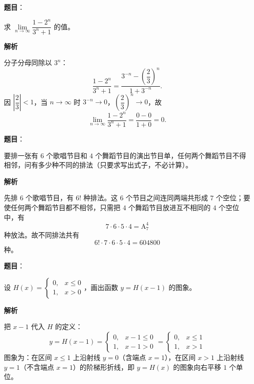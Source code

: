 \begin{answer}

\textbf{题目}：

求 $\lim\limits_{n\to\infty}\dfrac{1-2^n}{3^n+1}$ 的值。

\textbf{解析}

分子分母同除以 $3^n$：
\nopagebreak[4]
\[
\frac{1-2^n}{3^n+1}=\frac{3^{-n}-\left(\dfrac23\right)^n}{1+3^{-n}}.
\]
因 $\left|\dfrac23\right|<1$，当 $n\to\infty$ 时 $3^{-n}\to0$，$\left(\dfrac23\right)^n\to0$，故
\nopagebreak[4]
\[
\lim_{n\to\infty}\frac{1-2^n}{3^n+1}=\frac{0-0}{1+0}=0.
\]


\end{answer}
\begin{answer}

\textbf{题目}：

要排一张有 $6$ 个歌唱节目和 $4$ 个舞蹈节目的演出节目单，任何两个舞蹈节目不得相邻，问有多少种不同的排法（只要求写出式子，不必计算）。

\textbf{解析}

先排 $6$ 个歌唱节目，有 $6!$ 种排法。这 $6$ 个节目之间连同两端共形成 $7$ 个空位；要使任何两个舞蹈节目都不相邻，只需把 $4$ 个舞蹈节目放进互不相同的 $4$ 个空位中，有
\nopagebreak[4]
\[
7\cdot6\cdot5\cdot4=\mathrm{A}_7^4
\]
种放法。故不同排法共有
\nopagebreak[4]
\[
6!\cdot7\cdot6\cdot5\cdot4=604800
\]
种。


\end{answer}
\begin{answer}

\textbf{题目}：

设 $H(x)=\begin{cases}0,&x\leqslant0\\1,&x>0\end{cases}$，画出函数 $y=H(x-1)$ 的图象。

\textbf{解析}

把 $x-1$ 代入 $H$ 的定义：
\nopagebreak[4]
\[
y=H(x-1)=\begin{cases}0,&x-1\leqslant0\\1,&x-1>0\end{cases}
=\begin{cases}0,&x\leqslant1\\1,&x>1\end{cases}
\]
图象为：在区间 $x\leqslant1$ 上沿射线 $y=0$（含端点 $x=1$），在区间 $x>1$ 上沿射线 $y=1$（不含端点 $x=1$）的阶梯形折线，即 $y=H(x)$ 的图象向右平移 $1$ 个单位。


\end{answer}
